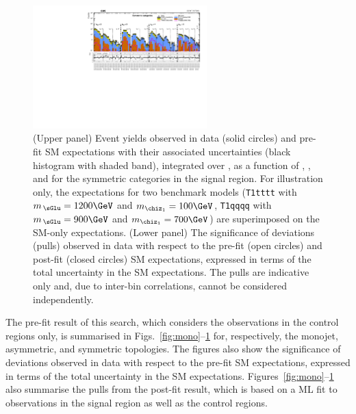 \begin{figure}[!h]
  \begin{center}
    \includegraphics[angle=90,width=0.6\textwidth]{figures/result/v3/summaryPlot_Symmetric_prefit_overlay_fit_b}
    \caption{(Upper panel) Event yields observed in data (solid
      circles) and pre-fit SM expectations with their associated
      uncertainties (black histogram with shaded band), integrated
      over \HTmiss, as a function of \njet, \nb, and \scalht for the
      symmetric \njet categories in the signal region. For
      illustration only, the expectations for two benchmark models
      (\texttt{T1tttt} with $m_{\,\sGlu} = 1200\GeV$ and $m_{\chiz_1}
      = 100\GeV$, \texttt{T1qqqq} with $m_{\,\sGlu} = 900\GeV$ and
      $m_{\chiz_1} = 700\GeV$) are superimposed on the SM-only
      expectations. (Lower panel) The significance of deviations
      (pulls) observed in data with respect to the pre-fit (open
      circles) and post-fit (closed circles) SM expectations,
      expressed in terms of the total uncertainty in the SM
      expectations. The pulls are indicative only and, due to
      inter-bin correlations, cannot be considered independently.}
    \label{fig:sym}
  \end{center}
\end{figure}

The pre-fit result of this search, which considers the
observations in the control regions only, is summarised in
Figs.~\ref{fig:mono}--\ref{fig:sym} for, respectively, the monojet,
asymmetric, and symmetric topologies.
The figures also show the significance of deviations observed in data
with respect to the pre-fit SM expectations, expressed in terms of
the total uncertainty in the SM
expectations. Figures~\ref{fig:mono}--\ref{fig:sym} also summarise the
pulls from the post-fit result, which is based on a ML fit to
observations in the signal region as well as the control regions.

